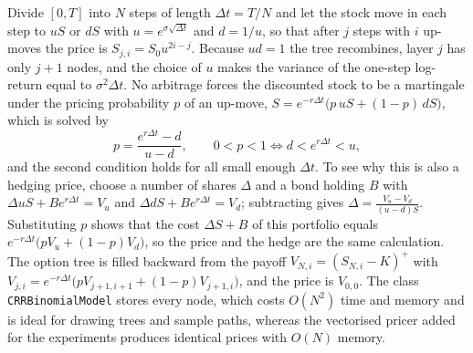 Divide $[0,T]$ into $N$ steps of length $\Delta t=T/N$ and let the stock move in each step to $uS$ or $dS$ with $u=e^{\sigma\sqrt{\Delta t}}$ and $d=1/u$, so that after $j$ steps with $i$ up-moves the price is $S_{j,i}=S_0u^{2i-j}$.
Because $ud=1$ the tree recombines, layer $j$ has only $j+1$ nodes, and the choice of $u$ makes the variance of the one-step log-return equal to $\sigma^2\Delta t$.
No arbitrage forces the discounted stock to be a martingale under the pricing probability $p$ of an up-move, $S=e^{-r\Delta t}\big(p\,uS+(1-p)\,dS\big)$, which is solved by
\begin{equation}\label{eq:crrp}
 p=\frac{e^{r\Delta t}-d}{u-d},\qquad 0<p<1\iff d<e^{r\Delta t}<u,
\end{equation}
and the second condition holds for all small enough $\Delta t$.
To see why this is also a hedging price, choose a number of shares $\Delta$ and a bond holding $B$ with $\Delta uS+Be^{r\Delta t}=V_u$ and $\Delta dS+Be^{r\Delta t}=V_d$; subtracting gives $\Delta=\frac{V_u-V_d}{(u-d)S}$.
Substituting $p$ shows that the cost $\Delta S+B$ of this portfolio equals $e^{-r\Delta t}\big(pV_u+(1-p)V_d\big)$, so the price and the hedge are the same calculation.
The option tree is filled backward from the payoff $V_{N,i}=(S_{N,i}-K)^+$ with $V_{j,i}=e^{-r\Delta t}\big(pV_{j+1,i+1}+(1-p)V_{j+1,i}\big)$, and the price is $V_{0,0}$.
The class \texttt{CRRBinomialModel} stores every node, which costs $O(N^2)$ time and memory and is ideal for drawing trees and sample paths, whereas the vectorised pricer added for the experiments produces identical prices with $O(N)$ memory.
